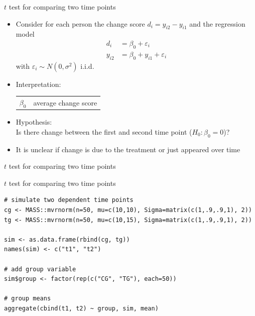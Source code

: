 \documentclass[aspectratio=169]{beamer}
\begin{document}
\begin{frame}{$t$ test for comparing two time points}
\begin{itemize}
  \item Consider for each person the change score $d_i = y_{i2} - y_{i1}$
    and the regression model
    \begin{align*}
         d_i &= \beta_0 + \varepsilon_i \\
      y_{i2} &= \beta_0 + y_{i1} + \varepsilon_i
    \end{align*}
    with $\varepsilon_i \sim N(0, \sigma^2)$ i.i.d.
  \item Interpretation:
    \begin{center}
    \begin{tabular}{ll}
    $\beta_0$ & average change score
    \end{tabular}
    \end{center}
  \item Hypothesis:\\
        Is there change between the first and second time point ($H_0\colon \beta_0 = 0$)?
  \item It is unclear if change is due to the treatment or just appeared
    over time
\end{itemize}
\end{frame}

\begin{frame}{$t$ test for comparing two time points}
\begin{center}
\end{center}
\end{frame}

\begin{frame}[fragile]{$t$ test for comparing two time points}
\begin{lstlisting}
# simulate two dependent time points
cg <- MASS::mvrnorm(n=50, mu=c(10,10), Sigma=matrix(c(1,.9,.9,1), 2))
tg <- MASS::mvrnorm(n=50, mu=c(10,15), Sigma=matrix(c(1,.9,.9,1), 2))

sim <- as.data.frame(rbind(cg, tg))
names(sim) <- c("t1", "t2")

# add group variable
sim$group <- factor(rep(c("CG", "TG"), each=50))

# group means
aggregate(cbind(t1, t2) ~ group, sim, mean)
\end{lstlisting}
\end{frame}
\end{document}

